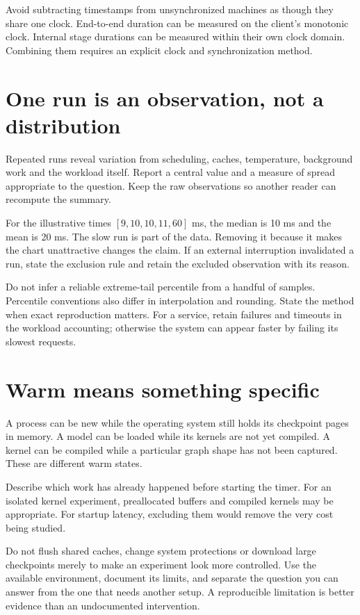 Avoid subtracting timestamps from unsynchronized machines as though
they share one clock. End-to-end duration can be measured on the
client's monotonic clock. Internal stage durations can be measured
within their own clock domain. Combining them requires an explicit
clock and synchronization method.

\section{One run is an observation, not a distribution}
Repeated runs reveal variation from scheduling, caches, temperature,
background work and the workload itself. Report a central value and
a measure of spread appropriate to the question. Keep the raw
observations so another reader can recompute the summary.

For the illustrative times $[9,10,10,11,60]$ ms, the median is 10 ms
and the mean is 20 ms. The slow run is part of the data. Removing it
because it makes the chart unattractive changes the claim. If an
external interruption invalidated a run, state the exclusion rule
and retain the excluded observation with its reason.

Do not infer a reliable extreme-tail percentile from a handful of
samples. Percentile conventions also differ in interpolation and
rounding. State the method when exact reproduction matters. For a
service, retain failures and timeouts in the workload accounting;
otherwise the system can appear faster by failing its slowest requests.

\section{Warm means something specific}
A process can be new while the operating system still holds its
checkpoint pages in memory. A model can be loaded while its kernels
are not yet compiled. A kernel can be compiled while a particular
graph shape has not been captured. These are different warm states.

Describe which work has already happened before starting the timer.
For an isolated kernel experiment, preallocated buffers and compiled
kernels may be appropriate. For startup latency, excluding them
would remove the very cost being studied.

Do not flush shared caches, change system protections or download
large checkpoints merely to make an experiment look more controlled.
Use the available environment, document its limits, and separate
the question you can answer from the one that needs another setup.
A reproducible limitation is better evidence than an undocumented
intervention.

